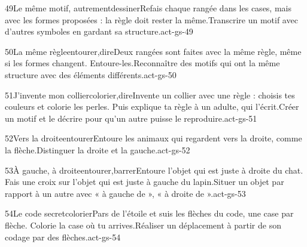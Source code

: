 \begin{activite}{49}{Le même motif, autrement}{dessiner}{Refais chaque rangée dans les cases, mais {\otBold\color{otNavy}avec les formes proposées} : la règle doit rester la même.}{Transcrire un motif avec d’autres symboles en gardant sa structure.}{act-gs-49}
\end{activite}
\begin{activite}{50}{La même règle}{entourer,dire}{Deux rangées sont faites avec la {\otBold\color{otNavy}même règle}, même si les formes changent. Entoure-les.}{Reconnaître des motifs qui ont la même structure avec des éléments différents.}{act-gs-50}
\end{activite}
\begin{activite}{51}{J’invente mon collier}{colorier,dire}{Invente un collier avec une {\otBold\color{otNavy}règle} : choisis tes couleurs et colorie les perles. Puis explique ta règle à un adulte, qui l’écrit.}{Créer un motif et le décrire pour qu’un autre puisse le reproduire.}{act-gs-51}
\end{activite}
\begin{activite}{52}{Vers la droite}{entourer}{Entoure les animaux qui regardent {\otBold\color{otNavy}vers la droite}, comme la flèche.}{Distinguer la droite et la gauche.}{act-gs-52}
\end{activite}
\begin{activite}{53}{À gauche, à droite}{entourer,barrer}{Entoure l’objet qui est juste {\otBold\color{otNavy}à droite} du chat. Fais une croix sur l’objet qui est juste {\otBold\color{otNavy}à gauche} du lapin.}{Situer un objet par rapport à un autre avec « à gauche de », « à droite de ».}{act-gs-53}
\end{activite}
\begin{activite}{54}{Le code secret}{colorier}{Pars de l’étoile et suis les flèches du code, une case par flèche. {\otBold\color{otNavy}Colorie} la case où tu arrives.}{Réaliser un déplacement à partir de son codage par des flèches.}{act-gs-54}
\end{activite}
